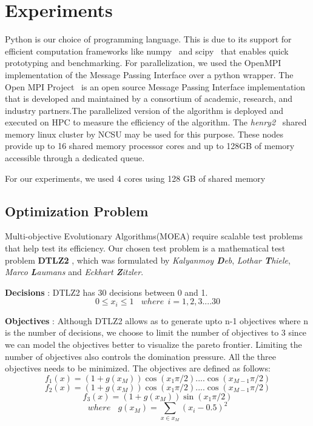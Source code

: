 \documentclass[conference]{IEEEtran}
\begin{document}
\section{Experiments}
Python is our choice of programming language. This is due to its support for efficient computation frameworks like numpy~\cite{numpy} and scipy~\cite{scipy} that enables quick prototyping and benchmarking.
For parallelization,  we used the OpenMPI implementation of the Message Passing Interface over a python wrapper. The Open MPI Project~\cite{openMPITool} is an open source Message Passing Interface implementation that is developed and maintained by a consortium of academic, research, and industry partners.The parallelized version of the algorithm is deployed and executed on HPC to measure the efficiency of the algorithm. The \textit{henry2}~\cite{ncsuHPC} shared memory linux cluster by NCSU may be used for this purpose. These nodes provide up to 16 shared memory processor cores and up to 128GB of memory accessible through a dedicated queue. 

For our experiments, we used 4 cores using 128 GB of shared memory

\subsection{Optimization Problem}
\label{problem}

Multi-objective Evolutionary Algorithms(MOEA) require scalable test problems that help test its efficiency. Our chosen test problem is a mathematical test problem \textbf{DTLZ2} \cite{debMOEA02}, which was formulated by \textit{Kalyanmoy \textbf{D}eb}, \textit{Lothar \textbf{T}hiele}, \textit{Marco \textbf{L}aumans} and \textit{Eckhart \textbf{Z}itzler}. 

\textbf{Decisions} : DTLZ2 has 30 decisions between 0 and 1.
\[0 \leq {x}_{i} \leq 1 \ \ \ \ where \ \  i = 1,2 ,3 .... 30\]

\textbf{Objectives} : Although DTLZ2 allows as to generate upto n-1 objectives where n is the number of decisions, we choose to limit the number of objectives to 3 since we can model the objectives better to visualize the pareto frontier. Limiting the number of objectives also controls the domination pressure. All the three objectives needs to be minimized. The objectives are defined as follows:
\[{f}_{1}(x) = (1+g({x}_{M}))\cos({x}_{1} \pi/2)....\cos({x}_{M-1} \pi/2)\]
\[{f}_{2}(x) = (1+g({x}_{M}))\cos({x}_{1} \pi/2)....\cos({x}_{M-1} \pi/2)\]
\[{f}_{3}(x) = (1+g({x}_{M}))\sin({x}_{1} \pi/2)\]
\[where \ \ \ \ g({x}_{M}) = \sum_{x \in {x}_{M}} (x_i - 0.5)^2 \]
\end{document}
